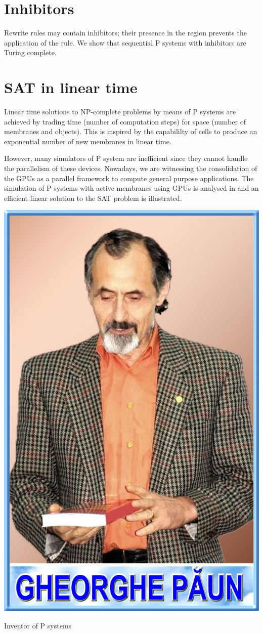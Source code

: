 \documentclass[myposter,portrait]{sciposter}
\def\mysection#1{
{\color{sectionCol}\section*{\sc\bfseries #1}}}
\begin{document}
\begin{multicols*}{3}
\mysection{Inhibitors}

Rewrite rules may contain inhibitors; their presence in the region prevents the application of the rule. We show that sequential P systems with inhibitors are Turing complete.


\mysection{SAT in linear time}

Linear time solutions to NP-complete problems by means of P systems are achieved by trading time (number of computation steps) for space (number of membranes and objects). This is inspired by the capabililty of cells to produce an exponential number of new membranes in linear time.

However, many simulators of P system are inefficient since they cannot handle the parallelism of these devices. Nowadays, we are witnessing the consolidation of the GPUs as a parallel framework to compute general purpose applications. The simulation of P systems with active membranes using GPUs is analysed in \cite{Cecilia10} and an efficient linear solution to the SAT problem is illustrated.

\includegraphics[width=\columnwidth]{paun}
\caption{Inventor of P systems}
 




\end{multicols*}
\end{document}
